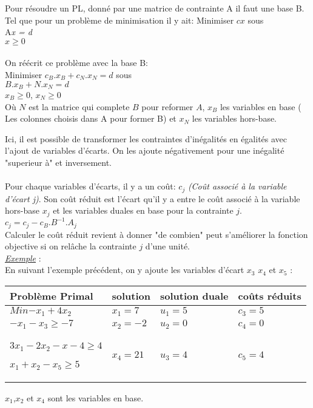 Pour résoudre un PL, donné par une matrice de contrainte A il faut une base B. Tel que pour un problème de minimisation il y ait:
\newline
\newline
\hspace{2.5cm}Minimiser $cx$ sous\\
\hspace{2.5cm} A\textit{x = d} \\
\hspace{2.5cm}\textit{ $x \geq 0$}
\\
\\
On réécrit ce problème avec la base B:\\
\hspace{2.5cm}Minimiser $c_B.x_B + c_N.x_N =d$ sous\\
\hspace{2.5cm}$B.x_B + N.x_N =d$\\
\hspace{2.5cm}\textit{ $x_B \geq 0$},\textit{ $x_N \geq 0$}\\

Où $N$ est la matrice qui complete $B$ pour reformer $A$, $x_B$ les variables en base ( Les colonnes choisis dans A pour former B) et  $x_N$ les variables hors-base.

Ici, il est possible de transformer les contraintes d'inégalités en égalités avec l'ajout de variables d'écarts. On les ajoute négativement pour une inégalité "superieur à" et inversement.\\
\\
Pour chaque variables d'écarts, il y a un coût: \textit{$c_j$} \textit{(Coût associé à la variable d'écart j)}.
Son coût réduit est l'écart qu'il y a entre le coût associé à la variable hors-base $x_j$ et les variables duales en base pour la contrainte $j$.\\
$c_j = c_j - c_B.B^{-1}.A_j$\\

Calculer le coût réduit revient à donner "de combien" peut s'améliorer la fonction objective si on relâche la contrainte $j$ d'une unité.
\newline
\\
\underline{\textit{Exemple}} : 
\\
En suivant l'exemple précédent, on y ajoute les variables d'écart $x_3$ $x_4$ et $x_5$ :\\
\begin{tabular}{ p{5 cm}p{3 cm}p{3 cm}p{3 cm}}
 \hline
Problème Primal  & solution & solution duale & coûts réduits \\
 \hline
$Min{ - x_1 + 4x_2}$ & $x_1 = 7$ & $u_1 = 5$ & $c_3 = 5$\\
$-x_1 -x_3 \geq -7$ 
&
$x_2 = -2$
&
$u_2 = 0$
&
$c_4 = 0$\\
$3x_1-2x_2 -x-4 \geq 4$

$x_1+x_2 -x_5 \geq 5$ & $x_4 = 21$ & $u_3 = 4$ & $c_5 = 4$\\
 \hline
\end{tabular}
$x_1$,$x_2$ et $x_4$ sont les variables en base.
